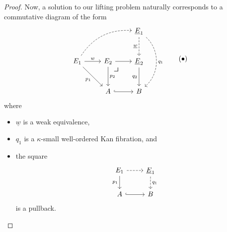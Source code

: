 \documentclass[10pt,letterpaper,cm]{nupset}
\theoremstyle{definition}
\theoremstyle{theorem}
\theoremstyle{remark}
\newcommand{\0}{\mathbf{0}}
\newcommand{\1}{\mathbf{1}}
\newcommand{\2}{\mathbf{2}}
\newcommand{\bi}{\begin{itemize}}
\newcommand{\ei}{\end{itemize}}
\begin{document}
\begin{proof}
\smallskip

Now, a solution to our lifting problem naturally corresponds  to a  commutative diagram of the form
\[ \label{uglydiag}
\begin{tikzcd}[row sep=large]
                                                                     &                                & \underline{E}_1 \arrow[d, "\underline{w}"', dashed] \arrow[dd, "q_1", dashed, bend left=49] \\
E_1 \arrow[r, "w"] \arrow[rd, "p_1"'] \arrow[rru, dashed, bend left] & E_2 \arrow[d, "p_2"] \arrow[r] \arrow[dr, phantom, "\scalebox{1.5}{\color{black}$\lrcorner$}" , very near start, color=black]
& \underline{E}_2 \arrow[d, "q_2"']                                               \\
                                                                     & A \arrow[r, hook]              & B                                                                  
\end{tikzcd} \tag{$\bullet$}
\] where
\bi
\item $\underline{w}$ is a weak equivalence,
\item $q_1$ is a $\kappa$-small well-ordered Kan fibration, and
\item the square
\[
\begin{tikzcd}
E_1 \arrow[d, "p_1"'] \arrow[r, dashed] & \underline{E}_1 \arrow[d, "q_1", dashed] \\
A \arrow[r, hook]                       & B                           
\end{tikzcd}
\] is a pullback.
\ei

\medskip




\end{proof}
\end{document}
